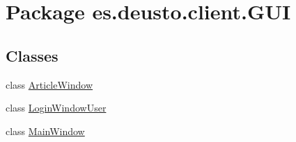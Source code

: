 \hypertarget{namespacees_1_1deusto_1_1client_1_1_g_u_i}{}\section{Package es.\+deusto.\+client.\+G\+UI}
\label{namespacees_1_1deusto_1_1client_1_1_g_u_i}
\subsection*{Classes}
\begin{DoxyCompactItemize}
\item 
class \hyperlink{classes_1_1deusto_1_1client_1_1_g_u_i_1_1_article_window}{Article\+Window}
\item 
class \hyperlink{classes_1_1deusto_1_1client_1_1_g_u_i_1_1_login_window_user}{Login\+Window\+User}
\item 
class \hyperlink{classes_1_1deusto_1_1client_1_1_g_u_i_1_1_main_window}{Main\+Window}
\end{DoxyCompactItemize}
